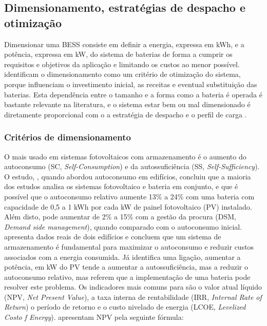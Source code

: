 \subsection{Dimensionamento, estratégias de despacho e otimização}
\label{sec:Ch2.1.7}

 Dimensionar uma BESS consiste em definir a energia, expressa em kWh, e a potência, expressa em kW, do sistema de baterias de forma a cumprir os requisitos e objetivos da aplicação e limitando os custos ao menor possível. \textcite{ Hesse2017} identificam o dimensionamento como um critério de otimização do sistema, porque influenciam o investimento inicial, as receitas e eventual substituição das baterias. Esta dependência entre o tamanho e a forma como a bateria é operada é bastante relevante na literatura, e o sistema estar bem ou mal dimensionado é diretamente proporcional com o a estratégia de despacho e o perfil de carga \cite{ Hesse2017}.


\subsubsection{Critérios de dimensionamento}
\label{sec:Ch2.1.7.1}

O mais usado em sistemas fotovoltaicos com armazenamento é o aumento do autoconsumo (SC, \textit{Self-Consumption}) e da autossuficiência (SS, \textit{Self-Sufficiency}). O estudo, \cite{ Luthander2015}, quando abordou autoconsumo em edifícios, concluiu que a maioria dos estudos analisa os sistemas fotovoltaico e bateria em conjunto, e que é possível que o autoconsumo relativo aumente 13\% a 24\% com uma bateria com capacidade de 0,5 a 1 kWh por cada kW de painel fotovoltaico (PV) instalado. Além disto, pode aumentar de 2\% a 15\% com a gestão da procura (DSM, \textit{Demand side management}), quando comparado com o autoconsumo inicial. \textcite{Cillari2021} apresenta dados reais de dois edifícios e concluem que um sistema de armazenamento é fundamental para maximizar o autoconsumo e reduzir custos associados com a energia consumida. Já \cite{Weniger2014 } identifica uma ligação, aumentar a potência, em kW do PV tende a aumentar a autossuficiência, mas a reduzir o autoconsumo relativo, mas referem que a implementação de uma bateria pode resolver este problema. 
Os indicadores mais comuns para são o valor atual líquido (NPV, \textit{Net Present Value}), a taxa interna de rentabilidade (IRR, \textit{Internal Rate of Return}) o período de retorno e o custo nivelado de energia (LCOE, \textit{Levelized Costo f Energy}). \textcite{ Azuatalam2019} apresentam NPV pela seguinte fórmula: 


